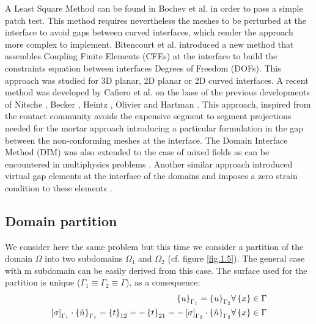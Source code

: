  A Least Square Method can be found in Bochev et al. \cite{bochev2007least} in order to pass a simple patch test. This method requires nevertheless the meshes to be perturbed at the interface to avoid gaps between curved interfaces, which render the approach more complex to implement.
 Bitencourt et al. \cite{bitencourt2015coupling} introduced a new method that assembles Coupling Finite Elements (CFEs) at the interface to build the constraints equation between interfaces Degrees of Freedom (DOFs). This approach was studied for 3D planar, 2D planar or 2D curved interfaces. 
 A recent method was developed by Cafiero et al. \cite{cafiero2016domain} on the base of the previous developments of Nitsche  \cite{nitsche1971variationsprinzip}, Becker \cite{becker2003finite}, Heintz \cite{heintz2006stabilized} , Olivier \cite{oliver2009contact} and Hartman \cite{hartmann2009contact}. This approach, inspired from the contact community avoids the expensive segment to segment projections needed for the mortar approach introducing a particular formulation in the gap between the non-conforming meshes at the interface. The Domain Interface Method (DIM) \cite{cafiero2016domain} was also extended to the case of mixed fields as can be encountered in multiphysics problems \cite{lloberas2017domain}. Another similar approach introduced virtual gap elements at the interface of the domains and imposes a zero strain condition to these elements \cite{song2017virtual}.
 \\
 \subsection{Domain partition}\label{ssec22}
 We consider here the same problem but this time we consider a partition of the domain $\Omega$ into two subdomains $\Omega_1$ and $\Omega_2$ (cf. figure \ref{fig.1.5}). The general case with m subdomain can be easily derived from this case. The surface used for the partition is unique  ($\Gamma_1 \equiv \Gamma_2 \equiv \Gamma$), as a consequence:
 \begin{eqnarray}
 \label{eq.13}
 \left\lbrace{u}\right \rbrace_{\Gamma_1}=\left\lbrace{u}\right \rbrace_{\Gamma_2} & \forall \left\lbrace{x}\right \rbrace \in \Gamma\\
 \label{eq.14}
 \left[{\sigma}\right]_{\Gamma_1}\cdot\left\lbrace{\hat{n}}\right \rbrace_{\Gamma_1}=\left\lbrace{t}\right \rbrace_{12}=-\left\lbrace{t}\right \rbrace_{21}=-\left[{\sigma}\right]_{\Gamma_2}\cdot\left\lbrace{\hat{n}}\right \rbrace_{\Gamma_2} & \forall \left\lbrace{x}\right \rbrace \in \Gamma
 \end{eqnarray}
 
